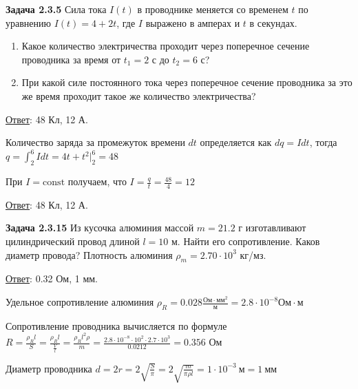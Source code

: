 \documentclass[12pt]{article}
\begin{document}
\begin{tcolorbox}
    \textbf{Задача 2.3.5} Сила тока $I(t)$ в проводнике меняется со временем $t$ по
    уравнению $I(t) = 4 + 2t$, где $I$ выражено в амперах и $t$
    в секундах.

    \begin{enumerate}
        \item Какое количество электричества проходит через поперечное сечение
        проводника за время от $t_1 = 2$ с до $t_2 = 6$ с? 
        \item При какой силе постоянного тока через поперечное сечение 
        проводника за это же время проходит
        такое же количество электричества?
    \end{enumerate}

    \begin{UpsideDown}
        \footnotesize
        \underline{Ответ}: 48 Кл, 12 А.
    \end{UpsideDown}
\end{tcolorbox}

Количество заряда за промежуток времени $dt$ определяется как $dq = I dt$, тогда $q = \int_2^6 Idt = 4t + t^2 \Big|_2^6 = 48$

При $I = \mathrm{const}$ получаем, что $I = \frac{q}{t} = \frac{48}{4} = 12$

\bigvspace

\underline{Ответ}: 48 Кл, 12 А.

\begin{tcolorbox}
    \textbf{Задача 2.3.15} Из кусочка алюминия массой $m = 21.2$ г изготавливают
    цилиндрический провод длиной $l = 10$ м. Найти его сопротивление. Каков диаметр провода? 
    Плотность алюминия $\rho_m = 2.70 \cdot 10^3$ кг/мз.

    \begin{UpsideDown}
        \footnotesize
        \underline{Ответ}: 0.32 Ом, 1 мм.
    \end{UpsideDown}
\end{tcolorbox}

Удельное сопротивление алюминия $\rho_R = 0.028 \frac{\text{Ом} \cdot \text{мм}^2}{\text{м}} = 2.8 \cdot 10^{-8} \text{Ом} \cdot \text{м}$

Сопротивление проводника вычисляется по формуле $R = \frac{\rho_R l}{S} = \frac{\rho_R l}{\frac{V}{l}} = \frac{\rho_R l^2 \rho}{m} = 
\frac{2.8 \cdot 10^{-8} \cdot 10^2 \cdot 2.7 \cdot 10^3}{0.0212} = 0.356$ Ом

Диаметр проводника $d = 2r = 2\sqrt{\frac{S}{\pi}} = 2\sqrt{\frac{m}{\pi \rho l}} = 1 \cdot 10^{-3} \ \text{м} = 1 \ \text{мм}$
\end{document}
